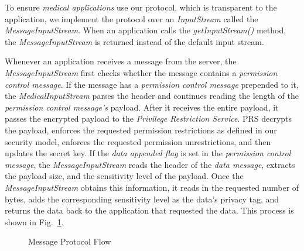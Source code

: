 To ensure \textit{medical applications} use our protocol, which is transparent
to the application, we implement the protocol over an \textit{InputStream}
called the \textit{MessageInputStream}. When an application calls the
\textit{getInputStream()} method, the \textit{MessageInputStream} is returned
instead of the default input stream.


Whenever an application receives a message from the server, the
\textit{MessageInputStream} first checks whether the message contains a
\textit{permission control message}.  If the message has a \textit{permission
control message} prepended to it, the \textit{MedicalInputStream} parses the
header and continues reading the length of the \textit{permission control
message's} payload.  After it receives the entire payload, it passes the
encrypted payload to the \textit{Privilege Restriction Service}.  PRS decrypts
the payload, enforces the requested permission restrictions as defined in our
security model, enforces the requested permission unrestrictions, and then
updates the secret key. If the \textit{data appended flag} is set in the
\textit{permission control message}, the \textit{MessageInputStream} reads the
header of the \textit{data message}, extracts the payload size, and the
sensitivity level of the payload.  Once the \textit{MessageInputStream} obtains
this information, it reads in the requested number of bytes, adds the
corresponding sensitivity level as the data's privacy tag, and returns the data
back to the application that requested the data.  This process is shown in
Fig.~\ref{fig:frameworkcomponents}. 

\begin{figure}[ht]
\centering
{}
\caption{Message Protocol Flow}
\label{fig:frameworkcomponents}
\end{figure}


